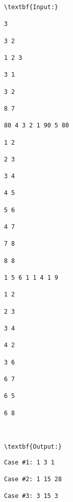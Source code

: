 \begin{verbatim}
\textbf{Input:}

3

3 2

1 2 3

3 1

3 2

8 7

80 4 3 2 1 90 5 80

1 2

2 3

3 4

4 5

5 6

4 7

7 8

8 8

1 5 6 1 1 4 1 9

1 2

2 3

3 4

4 2

3 6

6 7

6 5

6 8



\textbf{Output:}\end{verbatim}
\begin{verbatim}
Case #1: 1 3 1

Case #2: 1 15 28

Case #3: 3 15 3

\end{verbatim}